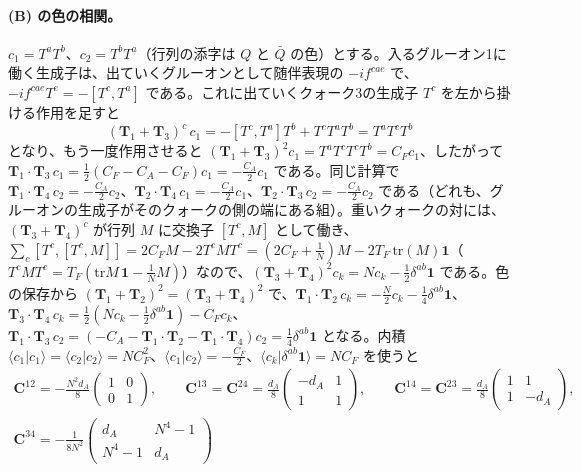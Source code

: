 \documentclass[a4paper,10pt]{ltjsarticle}
\begin{document}
\paragraph{(B) の色の相関。}$c_1=T^aT^b$、$c_2=T^bT^a$（行列の添字は $Q$ と $\bar Q$ の色）とする。入るグルーオン1に働く生成子は、出ていくグルーオンとして随伴表現の $-if^{cae}$ で、$-if^{cae}T^e=-[T^c,T^a]$ である。これに出ていくクォーク3の生成子 $T^c$ を左から掛ける作用を足すと
\begin{equation*}
(\boldsymbol T_1+\boldsymbol T_3)^c\,c_1=-[T^c,T^a]T^b+T^cT^aT^b=T^aT^cT^b
\end{equation*}
となり、もう一度作用させると $(\boldsymbol T_1+\boldsymbol T_3)^2c_1=T^aT^cT^cT^b=C_Fc_1$、したがって $\boldsymbol T_1\cdot\boldsymbol T_3\,c_1=\frac12(C_F-C_A-C_F)c_1=-\frac{C_A}2c_1$ である。同じ計算で $\boldsymbol T_1\cdot\boldsymbol T_4\,c_2=-\frac{C_A}2c_2$、$\boldsymbol T_2\cdot\boldsymbol T_4\,c_1=-\frac{C_A}2c_1$、$\boldsymbol T_2\cdot\boldsymbol T_3\,c_2=-\frac{C_A}2c_2$ である（どれも、グルーオンの生成子がそのクォークの側の端にある組）。重いクォークの対には、$(\boldsymbol T_3+\boldsymbol T_4)^c$ が行列 $M$ に交換子 $[T^c,M]$ として働き、$\sum_c[T^c,[T^c,M]]=2C_FM-2T^cMT^c=(2C_F+\frac1N)M-2T_F\,\mathrm{tr}(M)\mathbf 1$（$T^cMT^c=T_F(\mathrm{tr}M\,\mathbf 1-\frac1NM)$）なので、$(\boldsymbol T_3+\boldsymbol T_4)^2c_k=Nc_k-\frac12\delta^{ab}\mathbf 1$ である。色の保存から $(\boldsymbol T_1+\boldsymbol T_2)^2=(\boldsymbol T_3+\boldsymbol T_4)^2$ で、$\boldsymbol T_1\cdot\boldsymbol T_2\,c_k=-\frac N2c_k-\frac14\delta^{ab}\mathbf 1$、$\boldsymbol T_3\cdot\boldsymbol T_4\,c_k=\frac12(Nc_k-\frac12\delta^{ab}\mathbf 1)-C_Fc_k$、$\boldsymbol T_1\cdot\boldsymbol T_3\,c_2=(-C_A-\boldsymbol T_1\cdot\boldsymbol T_2-\boldsymbol T_1\cdot\boldsymbol T_4)c_2=\frac14\delta^{ab}\mathbf 1$ となる。内積 $\langle c_1|c_1\rangle=\langle c_2|c_2\rangle=NC_F^2$、$\langle c_1|c_2\rangle=-\frac{C_F}2$、$\langle c_k|\delta^{ab}\mathbf 1\rangle=NC_F$ を使うと
\begin{equation*}
\begin{gathered}
\boldsymbol C^{12}=-\frac{N^2d_A}{8}\begin{pmatrix}1&0\\0&1\end{pmatrix},\qquad
\boldsymbol C^{13}=\boldsymbol C^{24}=\frac{d_A}8\begin{pmatrix}-d_A&1\\1&1\end{pmatrix},\qquad
\boldsymbol C^{14}=\boldsymbol C^{23}=\frac{d_A}8\begin{pmatrix}1&1\\1&-d_A\end{pmatrix},\\
\boldsymbol C^{34}=-\frac{1}{8N^2}\begin{pmatrix}d_A&N^4-1\\N^4-1&d_A\end{pmatrix}
\end{gathered}
\end{equation*}
\end{document}
